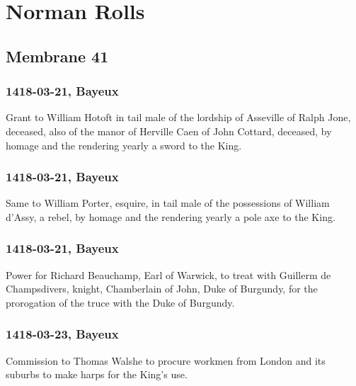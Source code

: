 \documentclass[a4paper,12pt,twoside]{book}
\begin{document}
    
    \newpage
    \chapter{Norman Rolls}
        \section{Membrane 41}
        
            \subsection{1418-03-21, Bayeux}
            
                  Grant to William Hotoft in tail male of the lordship of Asseville of Ralph Jone, deceased, also of the manor of Herville Caen of John Cottard, deceased, by homage and the rendering yearly a sword to the King.
               
            \subsection{1418-03-21, Bayeux}
            
                  Same to William Porter, esquire, in tail male of the possessions of William d'Assy, a rebel, by homage and the rendering yearly a pole axe to the King.
               
            \subsection{1418-03-21, Bayeux}
            
                  Power for Richard Beauchamp, Earl of Warwick, to treat with Guillerm de Champsdivers, knight, Chamberlain of John, Duke of Burgundy, for the prorogation of the truce with the Duke of Burgundy.
               
            \subsection{1418-03-23, Bayeux}
            
                  Commission to Thomas Walshe to procure workmen from London and its suburbs to make harps for the King's use.
               
\end{document}
